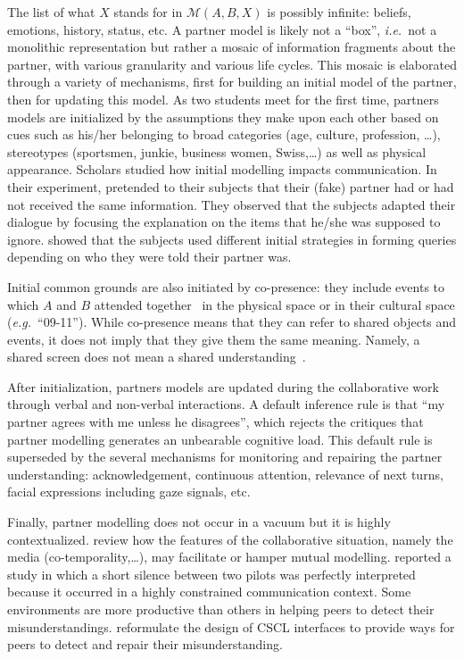 \documentclass[natbib]{svjour3}
\newcommand{\ie}{{\textit{i.e.\ }}}
\newcommand{\eg}{{\textit{e.g.\ }}}
\newcommand{\model}[3]{{$\mathcal{M}(#1, #2, #3)$}}
\begin{document}
The list of what $X$ stands for in \model{A}{B}{X} is possibly infinite:
beliefs, emotions, history, status, etc. A partner model is likely not a ``box'', \ie not a monolithic representation
but rather a mosaic of information fragments about the partner, with various
granularity and various life cycles. This mosaic is elaborated through a variety
of mechanisms, first for building an initial model of the partner, then for
updating this model. As two students meet for the first time, partners models are
initialized by the assumptions they make upon each other based on cues such as
his/her belonging to broad categories (age, culture, profession, \ldots),
stereotypes (sportsmen, junkie, business women, Swiss,\ldots) as well as physical
appearance. Scholars studied how initial modelling impacts communication. In
their experiment, \citet{slugoski1993attribution}
pretended to their subjects that their (fake) partner had or had not received
the same information. They observed that the subjects adapted their dialogue by
focusing the explanation on the items that he/she was supposed to ignore.
\citet{brennan1991conversation} showed that the subjects used different initial
strategies in forming queries depending on who they were told their partner was.  

Initial common grounds are also initiated by co-presence: they include events to
which $A$ and $B$ attended together~\citep{clark2002definite} in the physical
space or in their cultural space (\eg ``09-11''). While co-presence means that
they can refer to shared objects and events, it does not imply that they give
them the same meaning. Namely, a shared screen does not mean a shared
understanding~\citep{dillenbourg2006sharing}.

After initialization, partners models are updated during the collaborative work
through verbal and non-verbal interactions. A default inference rule is that ``my
partner agrees with me unless he disagrees'', which rejects the critiques that
partner modelling generates an unbearable cognitive load. This default rule is
superseded by the several mechanisms for monitoring and repairing the partner
understanding: acknowledgement, continuous attention, relevance of next turns,
facial expressions including gaze signals, etc.

Finally, partner modelling does not occur in a vacuum but it is highly contextualized.
\citet{clark1991grounding} review how the features of the collaborative
situation, namely the media (co-temporality,\ldots), may facilitate or hamper
mutual modelling.  \citet{hutchins1997constructing} reported a study in which a
short silence between two pilots was perfectly interpreted because it occurred
in a highly constrained communication context.  Some environments are more
productive than others in helping peers to detect their misunderstandings.
\citet{roschelle1995construction} reformulate the design of CSCL
interfaces to provide ways for peers to detect and repair their
misunderstanding.
\end{document}
